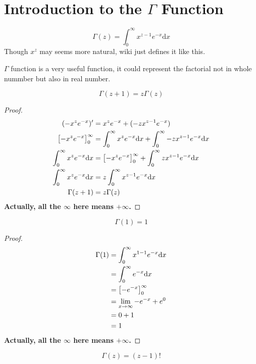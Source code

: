 \section{Introduction to the $\Gamma$ Function}
\begin{define}
  \[
    \Gamma(z) = \int_{0}^{\infty} x^{z-1} e^{-x} \mathrm{d}x
  \]
  \tcblower
  Though $x^z$ may seems more natural, wiki just defines it like this.
\end{define}
$\Gamma$ function is a very useful function, it could represent the factorial not in whole nummber but also in real number.
\begin{proposition}[]
  \[
    \Gamma(z+1) = z\Gamma(z)
  \]
\end{proposition}
\begin{proof}
  \begin{align*}
    (-x^ze^{-x})' &= x^ze^{-x} + (-zx^{z-1}e^{-x})\\
    \left[-x^ze^{-x}\right]_0^\infty &= \int_0^\infty x^ze^{-x} \mathrm{d}x + \int_0^\infty -zx^{z-1}e^{-x}\mathrm{d}x \\
    \int_0^\infty x^ze^{-x}\mathrm{d}x &= \left[-x^ze^{-x}\right]_0^\infty + \int_0^\infty zx^{z-1}e^{-x}\mathrm{d}x \\
    \int_0^\infty x^ze^{-x}\mathrm{d}x &=  z\int_0^\infty x^{z-1}e^{-x}\mathrm{d}x \\
    \Gamma(z+1) &= z\Gamma(z) \qedhere
  \end{align*}
  \textbf{Actually, all the $\infty$ here means $+\infty$.}
\end{proof}
\begin{proposition}[]
  \[
    \Gamma(1) = 1
  \]
\end{proposition}
\begin{proof}
  \begin{align*}
    \Gamma(1) &= \int_0^\infty x^{1-1}e^{-x} \mathrm{d}x \\
              &= \int_0^\infty e^{-x} \mathrm{d}x \\
              &= \left[-e^{-x}\right]_0^\infty \\
              &= \lim_{x\to \infty}-e^{-x} + e^0 \\
              &= 0 + 1 \\
              &= 1 \qedhere
  \end{align*}
  \textbf{Actually, all the $\infty$ here means $+\infty$.}
\end{proof}
\begin{corollary}[]
  \[\Gamma(z) = (z-1)!\]
\end{corollary}
